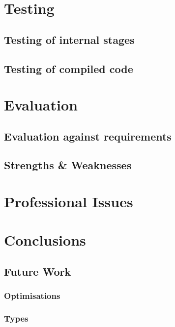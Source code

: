 \documentclass[11pt]{report}
\begin{document}
\chapter{Testing}
\section{Testing of internal stages}
\section{Testing of compiled code}


\chapter{Evaluation}
\section{Evaluation against requirements}
\section{Strengths \& Weaknesses}

\chapter{Professional Issues}

\chapter{Conclusions}
\section{Future Work}
\subsection{Optimisations}
\subsection{Types}
\end{document}
